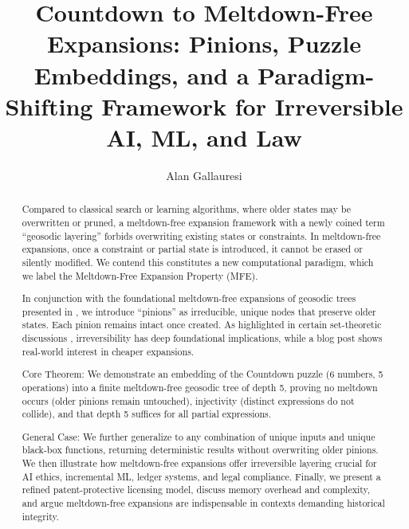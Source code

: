\documentclass[acmsmall]{acmart}
\theoremstyle{definition}
\theoremstyle{remark}
\begin{document}
\title{Countdown to Meltdown-Free Expansions: Pinions, Puzzle Embeddings, and a Paradigm-Shifting Framework for Irreversible AI, ML, and Law}

\author{Alan Gallauresi}

\begin{abstract}
Compared to classical search or learning algorithms, where older states
may be overwritten or pruned, a meltdown-free expansion framework with a newly coined term 
“geosodic layering” \cite{geosodicPaper2025}
forbids overwriting existing states or constraints. In meltdown-free expansions,
once a constraint or partial state is introduced, it cannot be erased or
silently modified. We contend this constitutes a new computational paradigm,
which we label the Meltdown-Free Expansion Property (MFE).

In conjunction with the foundational meltdown-free expansions of geosodic trees presented in
\cite{geosodicPaper2025}, we introduce “pinions” as irreducible, unique
nodes that preserve older states. Each pinion remains intact once created. As
highlighted in certain set-theoretic discussions \cite{kunen1980settheory},
irreversibility has deep foundational implications, while a blog post \cite{futurism2023blog}
shows real-world interest in cheaper expansions.

Core Theorem: We demonstrate an embedding of the Countdown puzzle
(6 numbers, 5 operations) into a finite meltdown-free geosodic tree of depth 5,
proving no meltdown occurs (older pinions remain untouched), injectivity (distinct
expressions do not collide), and that depth 5 suffices for all partial expressions.

General Case: We further generalize to any combination of unique inputs
and unique black-box functions, returning deterministic results without
overwriting older pinions. We then illustrate how meltdown-free expansions
offer irreversible layering crucial for AI ethics, incremental ML, ledger
systems, and legal compliance. Finally, we present a refined patent-protective
licensing model, discuss memory overhead and complexity, and argue meltdown-free
expansions are indispensable in contexts demanding historical integrity.
\end{abstract}

\maketitle
\end{document}
